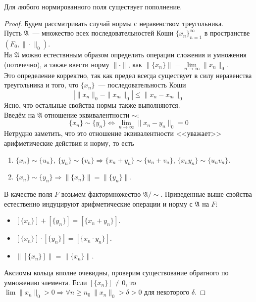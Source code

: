 \documentclass[11pt]{report}
\begin{document}
    \begin{theorem}
        Для любого нормированного поля существует пополнение.
    \end{theorem}
    \begin{proof}
        Будем рассматривать случай нормы с неравенством треугольника. \\
        Пусть $\mathfrak{A}$~--- множество всех последовательностей Коши $\{ x_n \}_{n = 1}^{\infty}$ в пространстве
        $(F_0, \| \cdot \|_0)$.\\
        На $\mathfrak{A}$ можно естествнным образом определить операции сложения и умножения (поточечно), а также ввести норму $\| \cdot \|$, как
        $\| \{ x_n \} \| = \lim\limits_{n \to \infty} \| x_n \|_{0}$.\\
        Это определение корректно, так как предел всегда существует в силу неравенства треугольника и того, что $\{ x_n \}$~---
        последовательность Коши
        \[ |\| x_n \|_0 - \| x_m \|_0 | \le \| x_n - x_m \|_0 \]
        Ясно, что остальные свойства нормы также выполняются. \\

        Введём на $\mathfrak{A}$  отношение эквивалентности $\sim$:
        \[ \{ x_n \} \sim \{ y_n \} \Leftrightarrow \lim\limits_{n \to \infty} \| x_n - y_n \|_0  = 0 \]
        Нетрудно заметить, что это отношение эквивалентности <<уважает>> арифметические действия и норму, то есть
        \begin{enumerate}
            \item $\{ x_n \} \sim \{ u_n \}, \ \{ y_n \} \sim \{ v_n \} \Rightarrow \{ x_n + y_n \} \sim \{ u_n + v_n \}$, $\{ x_n y_n \} \sim \{ u_n v_n \}$.
            \item $\{ x_n \} \sim \{ y_n \} \Rightarrow \| \{ x_n \} \| = \| \{ y_n \} \|$.
        \end{enumerate}

        В качестве поля $F$ возьмем фактормножество $\mathfrak{A}/\sim$. Приведенные выше свойства естественно индуцируют арифметические операции и норму
        с $\mathfrak{A}$ на $F$:
        \begin{itemize}
            \item $[\{ x_n \}] + [\{ y_n \}] = [\{ x_n + y_n \}]$.
            \item $[\{ x_n \}] \cdot [\{ y_n \}] = [\{ x_n \cdot y_n \}]$.
            \item $\| [\{ x_n \}] \| = \| \{ x_n \}\|$.
        \end{itemize}
        Аксиомы кольца вполне очевидны, проверим существование обратного по умножению элемента.
        Если $[\{ x_n \}] \neq 0$, то $\lim \| x_n \|_0 > 0 \Rightarrow \forall n \ge n_0 \ \| x_n \|_0 > \delta > 0$ для
        некоторого $\delta$.


\end{proof}
\end{document}
